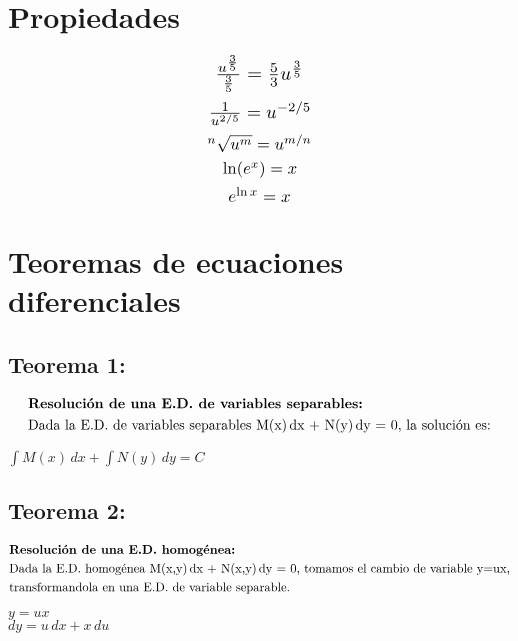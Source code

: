 \documentclass[a4paper,12pt,numbers=noenddot]{scrreprt}
\begin{document}
    \section*{Propiedades}
    \begin{multicols}{3}
        \begin{equation*}
            \scalebox{1.4}{$\frac{u^{\frac{3}{5}}}{\frac{3}{5}} = \frac{5}{3}u^{\frac{3}{5}}$}
        \end{equation*}
        \begin{equation*}
            \scalebox{1.3}{$\frac{1}{u^{2/5}} = u^{-2/5}$}
        \end{equation*}
        \begin{equation*}
            \scalebox{1.2}{$^n \sqrt{u^m} = u^{m/n}$}
        \end{equation*}    
        \begin{equation*}
            \scalebox{1.2}{$\ln(e^x) = x$}
        \end{equation*}
        \begin{equation*}
            \scalebox{1.2}{$e^{\ln x} = x$}	
        \end{equation*}
        \end{multicols}
\section*{Teoremas de ecuaciones diferenciales}
\subsection*{Teorema 1:}
\begin{align*}
    &\textbf{Resolución de una E.D. de variables separables:}\\
    &\text{Dada la E.D. de variables separables M(x)\,dx + N(y)\,dy = 0, la solución es:}
\end{align*}
\begin{center}
    \(\int M(x)\,dx + \int N(y)\,dy = C\)
\end{center}
\subsection*{Teorema 2:}
\begin{align*}
    &\textbf{Resolución de una E.D. homogénea:}\\
    &\text{Dada la E.D. homogénea M(x,y)\,dx + N(x,y)\,dy = 0, tomamos el cambio de variable y=ux,}\\ 
    &\text{transformandola en una E.D. de variable separable.}
\end{align*}
\begin{center}
    \(y=ux\)\\
    \(dy = u\,dx + x\,du\)
\end{center}
\end{document}
